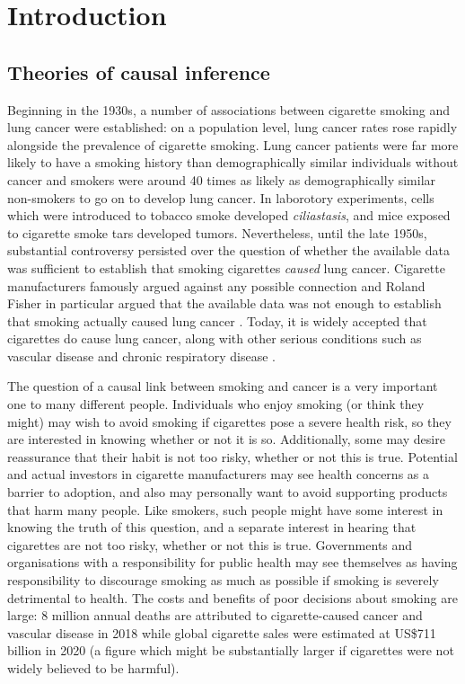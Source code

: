 


\chapter{Introduction}\label{ch:introduction}

\section{Theories of causal inference}

Beginning in the 1930s, a number of associations between cigarette smoking and lung cancer were established: on a population level, lung cancer rates rose rapidly alongside the prevalence of cigarette smoking. Lung cancer patients were far more likely to have a smoking history than demographically similar individuals without cancer and smokers were around 40 times as likely as demographically similar non-smokers to go on to develop lung cancer. In laborotory experiments, cells which were introduced to tobacco smoke developed \emph{ciliastasis}, and mice exposed to cigarette smoke tars developed tumors\citep{proctor_history_2012}. Nevertheless, until the late 1950s, substantial controversy persisted over the question of whether the available data was sufficient to establish that smoking cigarettes \emph{caused} lung cancer. Cigarette manufacturers famously argued against any possible connection \citep{oreskes_merchants_2011} and Roland Fisher in particular argued that the available data was not enough to establish that smoking actually caused lung cancer \citep{fisher_cancer_1958}. Today, it is widely accepted that cigarettes do cause lung cancer, along with other serious conditions such as vascular disease and chronic respiratory disease \citep{world_health_organisation_tobacco_nodate,wiblin_why_2016}.

The question of a causal link between smoking and cancer is a very important one to many different people. Individuals who enjoy smoking (or think they might) may wish to avoid smoking if cigarettes pose a severe health risk, so they are interested in knowing whether or not it is so. Additionally, some may desire reassurance that their habit is not too risky, whether or not this is true. Potential and actual investors in cigarette manufacturers may see health concerns as a barrier to adoption, and also may personally want to avoid supporting products that harm many people. Like smokers, such people might have some interest in knowing the truth of this question, and a separate interest in hearing that cigarettes are not too risky, whether or not this is true. Governments and organisations with a responsibility for public health may see themselves as having responsibility to discourage smoking as much as possible if smoking is severely detrimental to health. The costs and benefits of poor decisions about smoking are large: 8 million annual deaths are attributed to cigarette-caused cancer and vascular disease in 2018\citep{world_health_organisation_tobacco_nodate} while  global cigarette sales were estimated at US\$711 billion in 2020 \citep{noauthor_cigarettes_nodate} (a figure which might be substantially larger if cigarettes were not widely believed to be harmful).

